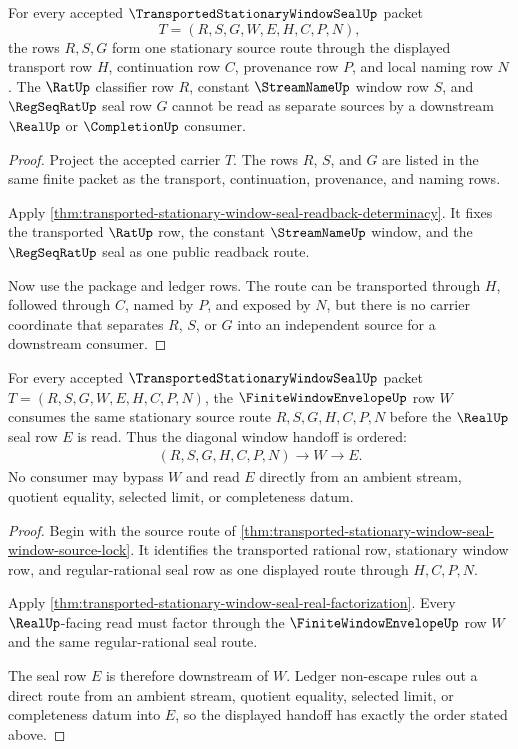 \begin{theorem}
\label{thm:transported-stationary-window-seal-window-source-lock}
For every accepted $\TransportedStationaryWindowSealUp$ packet
$$
T=(R,S,G,W,E,H,C,P,N),
$$
the rows $R,S,G$ form one stationary source route through the displayed transport row $H$, continuation row $C$, provenance row $P$, and local naming row $N$. The $\RatUp$ classifier row $R$, constant $\StreamNameUp$ window row $S$, and $\RegSeqRatUp$ seal row $G$ cannot be read as separate sources by a downstream $\RealUp$ or $\CompletionUp$ consumer.
\end{theorem}
\begin{proof}
Project the accepted carrier $T$. The rows $R$, $S$, and $G$ are listed in the same finite packet as the transport, continuation, provenance, and naming rows.

Apply \autoref{thm:transported-stationary-window-seal-readback-determinacy}. It fixes the transported $\RatUp$ row, the constant $\StreamNameUp$ window, and the $\RegSeqRatUp$ seal as one public readback route.

Now use the package and ledger rows. The route can be transported through $H$, followed through $C$, named by $P$, and exposed by $N$, but there is no carrier coordinate that separates $R$, $S$, or $G$ into an independent source for a downstream consumer.
\end{proof}

\begin{theorem}
\label{thm:transported-stationary-window-seal-stationary-diagonal-handoff}
For every accepted $\TransportedStationaryWindowSealUp$ packet $T=(R,S,G,W,E,H,C,P,N)$, the $\FiniteWindowEnvelopeUp$ row $W$ consumes the same stationary source route $R,S,G,H,C,P,N$ before the $\RealUp$ seal row $E$ is read. Thus the diagonal window handoff is ordered:
$$
\begin{aligned}
  (R,S,G,H,C,P,N)
  \longrightarrow W
  \longrightarrow E .
\end{aligned}
$$
No consumer may bypass $W$ and read $E$ directly from an ambient stream, quotient equality, selected limit, or completeness datum.
\end{theorem}
\begin{proof}
Begin with the source route of \autoref{thm:transported-stationary-window-seal-window-source-lock}. It identifies the transported rational row, stationary window row, and regular-rational seal row as one displayed route through $H,C,P,N$.

Apply \autoref{thm:transported-stationary-window-seal-real-factorization}. Every $\RealUp$-facing read must factor through the $\FiniteWindowEnvelopeUp$ row $W$ and the same regular-rational seal route.

The seal row $E$ is therefore downstream of $W$. Ledger non-escape rules out a direct route from an ambient stream, quotient equality, selected limit, or completeness datum into $E$, so the displayed handoff has exactly the order stated above.
\end{proof}

